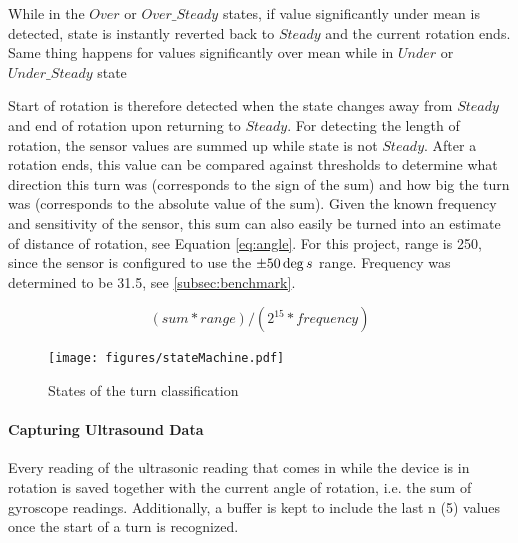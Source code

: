 While in the $Over$ or $Over\_Steady$ states, if value significantly under mean is detected, state is instantly reverted back to $Steady$ and the current rotation ends. Same thing happens for values significantly over mean while in $Under$ or $Under\_Steady$ state

Start of rotation is therefore detected when the state changes away from $Steady$ and end of rotation upon returning to $Steady$.
For detecting the length of rotation, the sensor values are summed up while state is not $Steady$.
After a rotation ends, this value can be compared against thresholds to determine what direction this turn was (corresponds to the sign of the sum) and how big the turn was (corresponds to the absolute value of the sum).
Given the known frequency and sensitivity of the sensor, this sum can also easily be turned into an estimate of distance of rotation, see Equation \ref{eq:angle}. For this project, range is 250, since the sensor is configured to use the $\pm50\deg\\s$ range. Frequency was determined to be 31.5, see \ref{subsec:benchmark}.

\begin{equation}
    (sum * range) / (2 ^{15}  * frequency)
    \label{eq:angle}
\end{equation}

\begin{figure}
    \centering
    \texttt{[image: figures/stateMachine.pdf]}
    \caption{States of the turn classification}

    \label{fig:stateMachine}
\end{figure}

\paragraph{Capturing Ultrasound Data}
Every reading of the ultrasonic reading that comes in while the device is in rotation is saved together with the current angle of rotation, i.e. the sum of gyroscope readings. Additionally, a buffer is kept to include the last n (5) values once the start of a turn is recognized.

